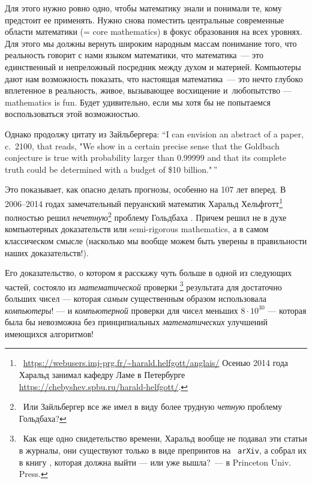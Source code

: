 \documentclass[intlimits,twoside,a4paper,11pt]{article}
\begin{document}
	Для этого нужно ровно одно, чтобы математику знали и понимали те, кому 
	предстоит ее применять. Нужно снова поместить центральные современные  
	области математики (= core mathematics) в фокус образования на всех 
	уровнях. Для этого мы должны вернуть широким народным массам понимание 
	того, что реальность говорит с нами языком математики, что математика~--- это 
	единственный и непреложный посредник между духом и материей.
	Компьютеры дают нам возможность показать, что настоящая математика~--- это 
	нечто глубоко вплетенное в реальность, живое, вызывающее восхищение и~любопытство --- mathematics is fun. Будет удивительно, если мы хотя бы не 
	попытаемся воспользоваться этой возможностью.
	\par
	Однако продолжу цитату из Зайльбергера:
	``I can envision an abstract of a paper,
	c.~2100, that reads, "We show in a certain precise sense that
	the Goldbach conjecture is true with probability larger than
	0.99999 and that its complete truth could be determined with
	a budget of \$10 billion."\,''
	\par
	Это показывает, как опасно делать прогнозы, особенно на 107 лет
	вперед. В 2006--2014 годах замечательный перуанский математик
	Харальд Хельфготт\footnote{{~\url{https://webusers.imj-prg.fr/\~harald.helfgott/anglais/}}
		Осенью 2014 года Харальд занимал кафедру Ламе 
		в Петербурге \url{https://chebyshev.spbu.ru/harald-helfgott/}.} 
	полностью решил {\it нечетную\/}\footnote{~Или Зайльбергер все же имел в виду
		более трудную {\it четную} проблему Гольдбаха?} проблему Гольдбаха 
	\cite{H1, H2, H3, H4, HP}. Причем решил не в духе компьютерных доказательств или 
	semi-rigorous mathematics, а в самом классическом смысле (насколько мы
	вообще можем быть уверены в правильности наших доказательств!). 
	\par
	Его доказательство, о котором я расскажу чуть больше в одной
	из следующих частей, состояло из {\it математической\/} проверки 
	\cite{H1,H2,H3}\footnote{~Как еще одно свидетельство времени, Харальд вообще
		не подавал эти статьи в журналы, они существуют только в виде препринтов на \,
		{\tt arXiv}, а собрал их в книгу \cite{H4}, которая должна выйти --- или 
		уже вышла?~--- в Princeton Univ. Press.}
	результата для достаточно больших чисел --- которая {\it самым\/} существенным 
	образом использовала {\it компьютеры\/}! --- и {\it компьютерной\/} проверки 
	\cite{HP} для чисел меньших $8\cdot 10^{30}$ --- которая была бы невозможна без 
	принципиальных {\it математических\/} улучшений имеющихся алгоритмов!
	\par
\end{document}
